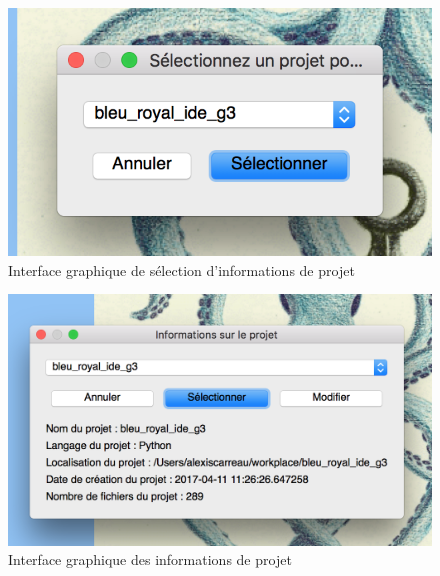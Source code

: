 \documentclass[a4paper,12pt]{article}
\begin{document}
\begin{figure}[h!]
			\begin{center}
				\includegraphics[scale=0.5]{images/imgs_projet/info_project1.png}
				\caption{Interface graphique de sélection d'informations de projet}
			\end{center}
		\end{figure}
		
\begin{figure}[h!]
			\begin{center}
				\includegraphics[scale=0.4]{images/imgs_projet/info_project2.png}
				\caption{Interface graphique des informations de projet}
			\end{center}
		\end{figure}
		
\end{document}
